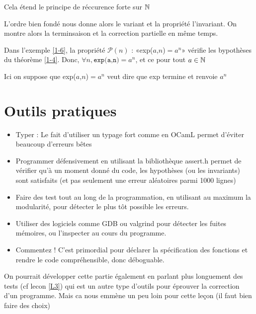 \begin{rem}
	Cela étend le principe de réccurence forte sur $\mathbb{N}$
\end{rem}

L'ordre bien fondé nous donne alors le variant et la propriété l'invariant. On montre alors la terminsaison et la correction partielle en même temps.

\begin{example}
	Dans l'exemple \ref{1-6}, la propriété $\mathcal P(n)$ : «exp($a$,$n$)$ = a^n$» vérifie les bypothèses du théorème \ref{1-4}. Donc, $\forall n, \texttt{exp(a,n)} = a^n$, et ce pour tout $a\in \mathbb{N}$
\end{example}

\begin{com}
	Ici on suppose que exp($a$,$n$)$ = a^n$ veut dire que exp termine et renvoie $a^n$
\end{com}

\section{Outils pratiques}

\begin{itemize}[label=$\star$]
	\item Typer : Le fait d'utiliser un typage fort comme en OCamL permet d'éviter beaucoup d'erreurs bêtes
	\item Programmer défensivement en utilisant la bibliothèque assert.h permet de vérifier qu'à un moment donné du code, les hypothèses (ou les invariants) sont satisfaits (et pas seulement une erreur aléatoires parmi 1000 lignes)
	\item Faire des test tout au long de la programmation, en utilisant au maximum la modularité, pour détecter le plus tôt possible les erreurs.
	\item Utiliser des logiciels comme GDB ou valgrind pour détecter les fuites mémoires, ou l'inspecter au cours du programme.
	\item Commentez ! C'est primordial pour déclarer la spécification des fonctions et rendre le code compréhensible, donc déboguable.
\end{itemize}


\begin{com}
	On pourrait développer cette partie également en parlant plus longuement des tests (cf lecon \ref{L3}) qui est un autre type d'outils pour éprouver la correction d'un programme. Mais ca nous emmène un peu loin pour cette leçon (il faut bien faire des choix)
\end{com}
